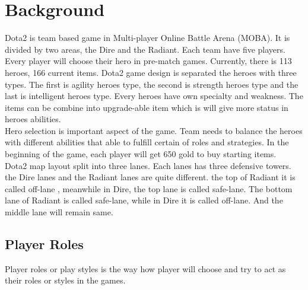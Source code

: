 \section{Background}
\label{sec:background}

Dota2 is team based game in Multi-player Online Battle Arena (MOBA). It is divided by two areas, the Dire and the Radiant. Each team have five players. Every player will choose their hero in pre-match games. Currently, there is 113 heroes, 166 current items. Dota2 game design is separated the heroes with three types. The first is agility heroes type, the second is strength heroes type and the last is intelligent heroes type. Every heroes have own specialty and weakness. The items can be combine into upgrade-able item which is will give more status in heroes abilities.
\\
Hero selection is important aspect of the game. Team needs to balance the heroes with different abilities that able to fulfill certain of roles and strategies. In the beginning of the game, each player will get 650 gold to buy starting items. 
\\
Dota2 map layout split into three lanes. Each lanes has three defensive towers. the Dire lanes and the Radiant lanes are quite different. the top of Radiant it is called off-lane , meanwhile in Dire, the top lane is called safe-lane. The bottom lane of Radiant is called safe-lane, while in Dire it is called off-lane. And the middle lane will remain same.
\\

\subsection{Player Roles}
\label{sec:player_roles}

Player roles or play styles is the way how player will choose and try to act as their roles or styles in the games.
